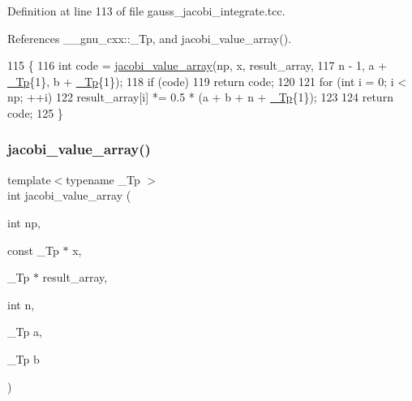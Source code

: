 Definition at line 113 of file gauss\+\_\+jacobi\+\_\+integrate.\+tcc.



References \+\_\+\+\_\+gnu\+\_\+cxx\+::\+\_\+\+Tp, and jacobi\+\_\+value\+\_\+array().


\begin{DoxyCode}
115   \{
116     \textcolor{keywordtype}{int} code = \hyperlink{gauss__jacobi__integrate_8tcc_a17622e4f72acae1977c8ab8deb58e77f}{jacobi\_value\_array}(np, x, result\_array,
117                                   n - 1, a + \hyperlink{namespace____gnu__cxx_a3b19a9c800ca194374ef9172290f7d79}{\_Tp}\{1\}, b + \hyperlink{namespace____gnu__cxx_a3b19a9c800ca194374ef9172290f7d79}{\_Tp}\{1\});
118     \textcolor{keywordflow}{if} (code)
119       \textcolor{keywordflow}{return} code;
120     
121     \textcolor{keywordflow}{for} (\textcolor{keywordtype}{int} i = 0; i < np; ++i)
122       result\_array[i] *= 0.5 * (a + b + n + \hyperlink{namespace____gnu__cxx_a3b19a9c800ca194374ef9172290f7d79}{\_Tp}\{1\});
123 
124     \textcolor{keywordflow}{return} code;
125   \}
\end{DoxyCode}
\mbox{\label{gauss__jacobi__integrate_8tcc_a17622e4f72acae1977c8ab8deb58e77f}} 
\subsubsection{\texorpdfstring{jacobi\+\_\+value\+\_\+array()}{jacobi\_value\_array()}}
{\footnotesize\ttfamily template$<$typename \+\_\+\+Tp $>$ \\
int jacobi\+\_\+value\+\_\+array (\begin{DoxyParamCaption}\item[{int}]{np,  }\item[{const \+\_\+\+Tp $\ast$}]{x,  }\item[{\+\_\+\+Tp $\ast$}]{result\+\_\+array,  }\item[{int}]{n,  }\item[{\+\_\+\+Tp}]{a,  }\item[{\+\_\+\+Tp}]{b }\end{DoxyParamCaption})}



